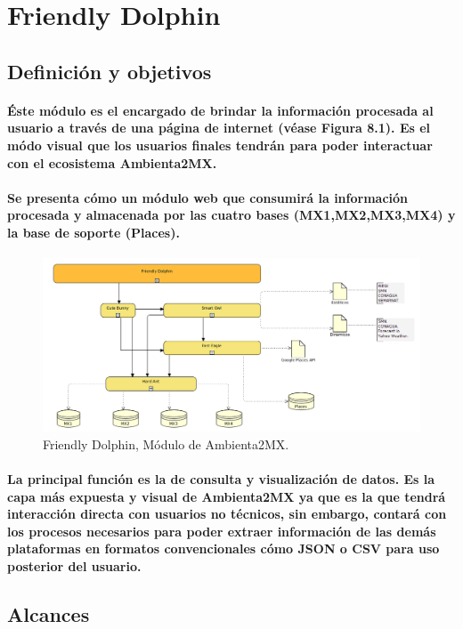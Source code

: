 \section{Friendly Dolphin}
  \subsection{Definición y objetivos}
    \paragraph{Éste módulo es el encargado de brindar la información procesada al usuario a través de una página de internet (véase Figura 8.1). Es el módo visual que los usuarios finales tendrán para poder interactuar con el ecosistema Ambienta2MX.}
    \paragraph{Se presenta cómo un módulo web que consumirá la información procesada y almacenada por las cuatro bases (MX1,MX2,MX3,MX4) y la base de soporte (Places).}
    \begin{figure}[h!]
        \centering
          \includegraphics[width=\textwidth]{./images/DiagramaAmbienta2MX_FriendlyDolphin.png}
        \caption{Friendly Dolphin, Módulo de Ambienta2MX.}
    \end{figure}
    \paragraph{La principal función es la de consulta y visualización de datos. Es la capa más expuesta y visual de Ambienta2MX ya que es la que tendrá interacción directa con usuarios no técnicos, sin embargo, contará con los procesos necesarios para poder extraer información de las demás plataformas en formatos convencionales cómo JSON o CSV para uso posterior del usuario.}
  \subsection{Alcances}
